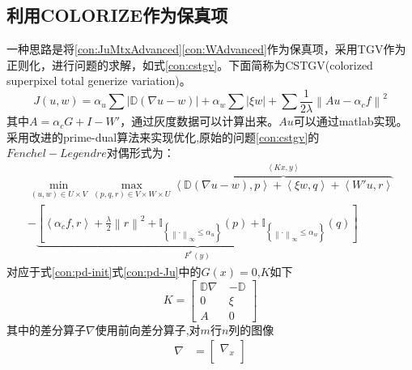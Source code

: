 \documentclass[UTF8]{ctexart}
\begin{document}
\begin{sloppypar}
    \subsection{利用COLORIZE作为保真项}
    一种思路是将\eqref{con:JuMtxAdvanced}\eqref{con:WAdvanced}作为保真项，采用TGV作为正则化，进行问题的求解，如式\eqref{con:cstgv}。下面简称为CSTGV(colorized superpixel total generize variation)。
    \begin{equation}
        J(u,w) = \alpha_u \sum \left|\mathbb{D}(\nabla u-w) \right| + \alpha_w \sum \left| \xi w \right| + \sum \frac{1}{2\lambda} \left\|   Au-\alpha_c f \right\|^2
        \label{con:cstgv}
    \end{equation}
    其中$A=\alpha_{c}G+I-W'$，通过灰度数据可以计算出来。$Au$可以通过matlab实现。
    采用改进的prime-dual算法来实现优化,原始的问题\eqref{con:cstgv}的$Fenchel-Legendre$对偶形式为：
    \begin{equation}
        \begin{aligned}
            \mathop {\min}\limits_{(u,w)\in U\times V} \max \limits_{(p,q,r)\in V \times W \times U}
            \overbrace{\left< \mathbb{D}(\nabla u-w),p\right> + \left< \xi w,q \right> + \left< W'u,r \right>}^{\left< Kx,y \right>}\\
            -\underbrace{ \left[ \left< \alpha_c f,r \right> + \frac{\lambda}{2}\left\| r \right\|^2
            + \mathbb{I}_{\left\{\left\|\cdot\right\|_\infty \leq \alpha_u\right\}}(p)
                + \mathbb{I}_{\left\{\left\|\cdot\right\|_\infty \leq \alpha_w\right\}}(q)\right]
            }_{F^*(y)}
        \end{aligned}
        \label{con:pd-Ju}
    \end{equation}
    对应于式\eqref{con:pd-init}式\eqref{con:pd-Ju}中的$G(x)=0$,$K$如下
    \begin{equation}
        K=\begin{bmatrix}
              \mathbb{D} \nabla \ & -\mathbb{D}\\
              0                        & \xi \\
              A                      &   0
        \end{bmatrix}
        \label{con:K}
    \end{equation}
    其中的差分算子$\nabla$使用前向差分算子,对$m$行$n$列的图像
    \begin{equation}
        \begin{aligned}
        \nabla &= \begin{bmatrix}
                     \nabla_x\\

\end{bmatrix}
\end{aligned}
\end{equation}
\end{sloppypar}
\end{document}
